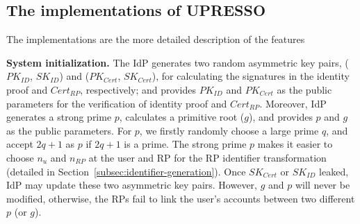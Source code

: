 \subsection{The implementations of UPRESSO}



{\color{red} The implementations are the more detailed description of the features}


\vspace{1mm}\noindent \textbf{System initialization.} The IdP generates two random asymmetric key pairs, ($PK_{ID}$, $SK_{ID}$) and ($PK_{Cert}$, $SK_{Cert}$),
for calculating the signatures in the identity proof and $Cert_{RP}$, respectively;
and provides $PK_{ID}$ and $PK_{Cert}$ as the public parameters for the verification of identity proof and $Cert_{RP}$.
Moreover, IdP generates a strong prime $p$, calculates  a primitive root ($g$), and provides $p$ and $g$ as the public parameters.
For $p$, we firstly randomly choose a large prime $q$, and accept  $2q+1$ as $p$ if $2q+1$ is a prime.
The strong prime $p$ makes it easier to choose $n_{u}$ and $n_{RP}$ at the user and RP for the RP identifier transformation (detailed in  Section~\ref{subsec:identifier-generation}). %
Once $SK_{Cert}$ or $SK_{ID}$ leaked, IdP may update these two asymmetric key pairs.
However, $g$ and $p$ will never be modified, otherwise, the RPs fail to link the user's accounts between two different $p$ (or $g$).


